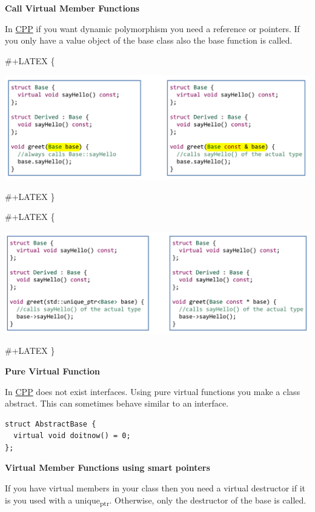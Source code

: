 \documentclass[11pt,twoside,landscape]{article}
\begin{document}
\begin{multicols}{3}
\textbf{Call Virtual Member Functions}

In \href{../../../roam/20210920103243-c.org}{CPP} if you want dynamic polymorphism you need a reference or pointers.
If you only have a value object of the base class also the base function is called.


\#+LATEX \{
\begin{center}
\includegraphics[width=.9\linewidth]{img/calling_virtual_member_functions.png}
\end{center}
\#+LATEX \}

\#+LATEX \{
\begin{center}
\includegraphics[width=.9\linewidth]{img/virtual_member_function2.png}
\end{center}
\#+LATEX \}

\textbf{Pure Virtual Function}

In \href{../../../roam/20210920103243-c.org}{CPP} does not exist interfaces.
Using pure virtual functions you make a class abstract.
This can sometimes behave similar to an interface.


\lstset{language=c++,label= ,caption= ,captionpos=b,numbers=none}
\begin{lstlisting}
struct AbstractBase {
  virtual void doitnow() = 0;
};
\end{lstlisting}

\textbf{Virtual Member Functions using smart pointers}

If you have virtual members in your class then you need a virtual destructor if it is you used with a unique\textsubscript{ptr}.
Otherwise, only the destructor of the base is called.


\end{multicols}
\end{document}
